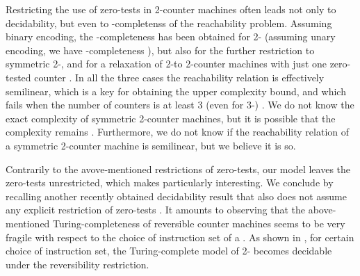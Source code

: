 Restricting the use of zero-tests in 2-counter machines often
leads not only to decidability, but even 
to \pspace-completenss of the reachability problem.
Assuming binary encoding,
the \pspace-completeness has been obtained for 2-\vass 
\cite{Blondin15,BEFGHLMT21}
(assuming unary encoding, we have \nl-completeness \cite{ELT16}),
but also for the further restriction to symmetric 2-\vass \cite{KL24},
and for a relaxation of 2-\vass to 
2-counter machines with just one zero-tested counter \cite{FLS18}.
In all the three cases the reachability relation is effectively semilinear, which
is a key for obtaining the \pspace upper complexity bound, and which 
fails when the number of counters is at least 3 (even for 3-\vass) 
\cite{HopcroftPansiot}.
We do not know the exact complexity of symmetric 2-counter machines,
but it is possible that the complexity remains \pspace.
Furthermore, we do not know if the reachability relation of a
symmetric 2-counter machine is semilinear, but we believe it is so.

Contrarily to the avove-mentioned restrictions of zero-tests, 
our model leaves the zero-tests unrestricted, which makes
 particularly interesting.
We conclude by recalling another recently obtained decidability result that
also does not assume any explicit restriction of zero-tests \cite{Dudenhefner22}.
It amounts to observing that
the above-mentioned Turing-completeness of 
reversible counter machines seems to be very fragile with respect
to the choice of instruction set of a \cm.
As shown in \cite{Dudenhefner22},
for certain 
choice of instruction set, the Turing-complete model of 2-
becomes decidable under the reversibility restriction.
% 
